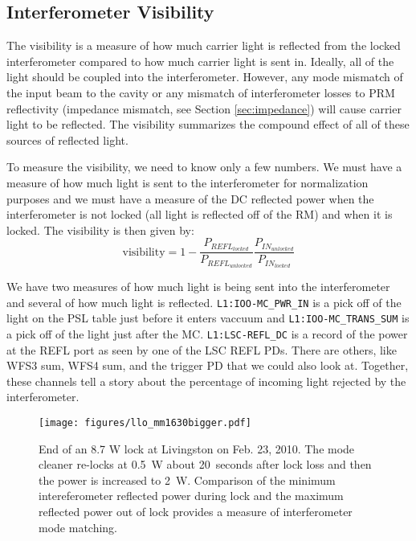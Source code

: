 \subsection{Interferometer Visibility}
The visibility is a measure of how much carrier light is reflected from the
locked interferometer compared to how much carrier light is sent in. Ideally,
all of the light should be coupled into the interferometer. However,
any mode mismatch of the input beam to the cavity or any mismatch of
interferometer losses to PRM reflectivity (impedance mismatch, see
Section \ref{sec:impedance}) will
cause carrier light to be reflected. The visibility summarizes the
compound effect of all of these sources of reflected light.

To measure the visibility, we need to know only a few numbers. We must
have a measure of how much light is sent to the interferometer for
normalization purposes and we must have a measure of the DC reflected
power when the interferometer is not locked (all light is reflected
off of the RM) and when it is locked. The visibility is then given
by:
\begin{equation}
\mbox{visibility} = 1 -
\frac{P_{REFL_{locked}}}{P_{REFL_{unlocked}}} \frac{P_{IN_{unlocked}}}{P_{IN_{locked}}}
\end{equation}

We have two measures of how much light is being sent into the
interferometer and several of how much light is
reflected. \texttt{L1:IOO-MC\_PWR\_IN} is a pick off of the light on
the PSL table just before it 
enters vaccuum and \texttt{L1:IOO-MC\_TRANS\_SUM} is a pick off of the light just after
the MC. \texttt{L1:LSC-REFL\_DC} is a record of the power at the REFL
port as seen by one of the LSC REFL PDs. There are others, like WFS3
sum, WFS4 sum, and the trigger PD that we could also look at. Together, these channels tell
a story about the percentage of incoming light rejected by the interferometer.

\begin{figure}
\begin{centering}
\texttt{[image: figures/llo\_mm1630bigger.pdf]}
\caption[End of an 8.7 W lock at Livingston on Feb. 23, 2010]{End of
  an 8.7 W lock at Livingston on Feb. 23, 2010. The mode cleaner
  re-locks at 0.5~W about 20~seconds after lock loss and then the
  power is increased to 2~W. Comparison of the minimum intereferometer
  reflected power during lock and the maximum reflected power out of
  lock provides a measure of interferometer mode matching.}
\label{fig:llomm1630}
\end{centering}
\end{figure}

